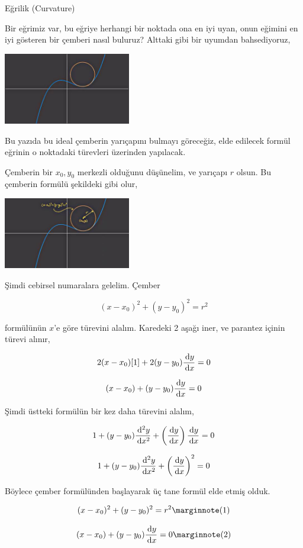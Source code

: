 \documentclass[12pt,fleqn]{article}\usepackage{../../common}
\begin{document}
Eğrilik (Curvature)

Bir eğrimiz var, bu eğriye herhangi bir noktada ona en iyi uyan, onun eğimini en
iyi gösteren bir çemberi nasıl buluruz? Alttaki gibi bir uyumdan bahsediyoruz,

\includegraphics[width=15em]{calc_multi_60_01.jpg}

Bu yazıda bu ideal çemberin yarıçapını bulmayı göreceğiz, elde edilecek
formül eğrinin o noktadaki türevleri üzerinden yapılacak.

Çemberin bir $x_0,y_0$ merkezli olduğunu düşünelim, ve yarıçapı $r$ olsun. Bu
çemberin formülü şekildeki gibi olur,

\includegraphics[width=15em]{calc_multi_60_02.jpg}

Şimdi cebirsel numaralara gelelim. Çember 

$$
(x-x_0)^2 + (y-y_0)^2 = r^2
$$

formülünün $x$'e göre türevini alalım. Karedeki 2 aşağı iner, ve parantez içinin
türevi alınır,

$$
2 (x-x_0) [1] + 2(y-y_0) \frac{\,\mathrm{d} y}{\,\mathrm{d} x} = 0
$$

$$
(x-x_0) + (y-y_0) \frac{\,\mathrm{d} y}{\,\mathrm{d} x} = 0
$$

Şimdi üstteki formülün bir kez daha türevini alalım,

$$
1 + (y-y_0) \frac{\,\mathrm{d}^2y}{\,\mathrm{d} x^2} +
\left(  \frac{\,\mathrm{d} y}{\,\mathrm{d} x}  \right) \frac{\,\mathrm{d} y}{\,\mathrm{d} x}  = 0
$$

$$
1 + (y-y_0) \frac{\,\mathrm{d}^2y}{\,\mathrm{d} x^2} +
\left(  \frac{\,\mathrm{d} y}{\,\mathrm{d} x}  \right)^2 = 0
$$

Böylece çember formülünden başlayarak üç tane formül elde etmiş olduk.

$$
(x-x_0)^2 + (y-y_0)^2 = r^2
\mlabel{1}
$$

$$
(x-x_0) + (y-y_0) \frac{\ud y}{\ud x} = 0
\mlabel{2}
$$
\end{document}
